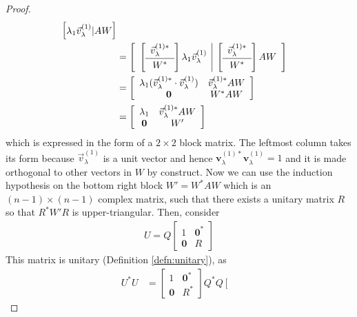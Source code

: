 \begin{proof}
\begin{align}
\begin{bmatrix}
\lambda_1\vec{v}_\lambda^{(1)} | AW
\end{bmatrix} \nonumber \\
&= 
\left[\begin{array}{c|c}
\left[\begin{array}{c}
\vec{v}_\lambda^{(1)*} \Bstrut \\
\hline
W^* \Tstrut
\end{array}\right]\lambda_1\vec{v}_\lambda^{(1)} &
\left[\begin{array}{c}
\vec{v}_\lambda^{(1)*} \Bstrut \\
\hline
W^* \Tstrut
\end{array}\right]AW
\end{array}\right] \nonumber \\
&=
\left[\begin{array}{cc}
\lambda_1 (\vec{v}_\lambda^{(1)*} \cdot \vec{v}_\lambda^{(1)}) & \vec{v}_\lambda^{(1)*}AW \\
\textbf{0} & W^*AW
\end{array}\right] \nonumber \\
&=
\left[\begin{array}{cc}
\lambda_1 & \vec{v}_\lambda^{(1)*}AW \\
\textbf{0} & W'
\end{array}\right] \label{eqn:QAQSchur}
\end{align}
which is expressed in the form of a $2\times 2$ block matrix. The leftmost column takes its form because $\vec{v}_\lambda^{(1)}$ is a unit vector and hence $\textbf{v}_\lambda^{(1)*} \textbf{v}_\lambda^{(1)} = 1$ and it is made orthogonal to other vectors in $W$ by construct. Now we can use the induction hypothesis on the bottom right block $W' = W^*AW$ which is an $(n-1) \times (n-1)$ complex matrix, such that there exists a unitary matrix $R$ so that $R^*W'R$ is upper-triangular. Then, consider
\begin{align}
U = 
Q 
\left[\begin{array}{cc}
1 & \textbf{0}^* \\
\textbf{0} & R
\end{array}\right]
\end{align}
This matrix is unitary (Definition \ref{defn:unitary}), as
\begin{align*}
U^*U &= 
\left[\begin{array}{cc}
1 & \textbf{0}^* \\
\textbf{0} & R^*
\end{array}\right]
Q^* Q 
\left[\begin{array}{cc}

\end{array}
\end{align*}
\end{proof}
